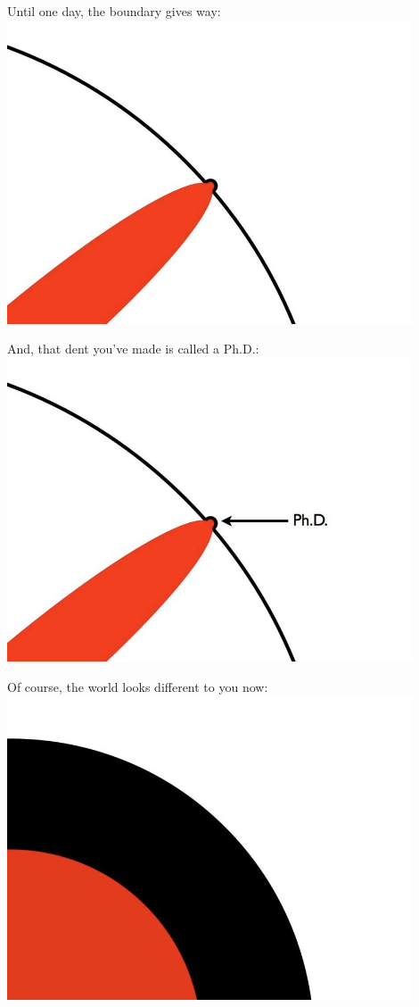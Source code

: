 \documentclass{beamer}
\begin{document}
\begin{frame}
	Until one day, the boundary gives way:
	\center\includegraphics[width=0.9\textwidth]{figures/fig_9}
\end{frame}

\begin{frame}
	And, that dent you've made is called a Ph.D.:
	\center\includegraphics[width=0.9\textwidth]{figures/fig_10}
\end{frame}

\begin{frame}
	Of course, the world looks different to you now:
	\center\includegraphics[width=0.9\textwidth]{figures/fig_11}
\end{frame}
\end{document}
